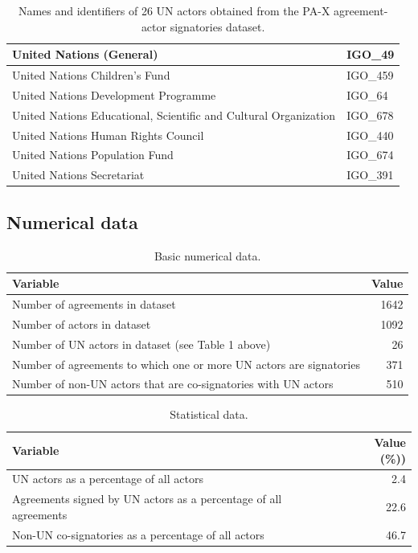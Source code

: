 \documentclass{article}
\begin{document}
\begin{table}[H]
\begin{center}
\begin{tabularx}{\textwidth}{|X|l|}
	United Nations (General) & IGO\_49 \\
	\hline
	United Nations Children's Fund & IGO\_459 \\
	\hline
	United Nations Development Programme & IGO\_64 \\
	\hline
	United Nations Educational, Scientific and Cultural Organization & IGO\_678 \\
	\hline
	United Nations Human Rights Council & IGO\_440 \\
	\hline
	United Nations Population Fund & IGO\_674 \\
	\hline
	United Nations Secretariat & IGO\_391 \\
	\hline
\end{tabularx}
\end{center}
\normalsize
\caption{Names and identifiers of 26 UN actors obtained from the PA-X agreement-actor signatories dataset. }
\end{table}

\subsection{Numerical data}

\begin{table}[H]
\begin{center}
\small
\begin{tabularx}{\textwidth}{|X|r|}
    \hline
    \textbf{Variable} & \textbf{Value} \\
    \hline
    \hline
     Number of agreements in dataset & 1642 \\
     \hline
     Number of actors in dataset & 1092 \\
     \hline
     Number of UN actors in dataset (see Table 1 above) & 26 \\
     \hline
     Number of agreements to which one or more UN actors are signatories & 371 \\
     \hline
     Number of non-UN actors that are co-signatories with UN actors  & 510  \\
     \hline
\end{tabularx}
\end{center}
\normalsize
\caption{Basic numerical data.}
\end{table}

\begin{table}[H]
\begin{center}
\small
\begin{tabularx}{\textwidth}{|X|r|}
    \hline
    \textbf{Variable} & \textbf{Value (\%))} \\
    \hline
    \hline
     UN actors as a percentage of all actors  & 2.4  \\
     \hline
     Agreements signed by UN actors as a percentage of all agreements  & 22.6  \\
     \hline
     Non-UN co-signatories as a percentage of all actors & 46.7  \\
     \hline
\end{tabularx}
\end{center}
\normalsize
\caption{Statistical data.}
\end{table}
\end{document}
